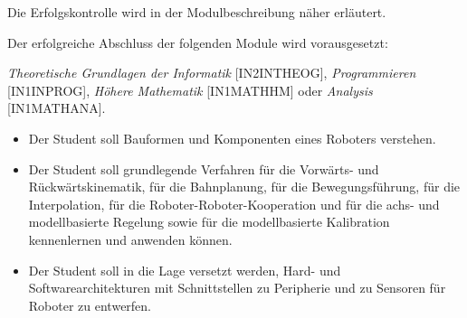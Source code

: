 \begin{course}

\setdoclanguagegerman
{}



\coursehead


\label{cour_5593.dp_997}


\begin{styleenv}
\begin{assessment}
Die Erfolgskontrolle wird in der Modulbeschreibung näher erläutert.


\end{assessment}

\begin{conditions}Der erfolgreiche Abschluss der folgenden Module wird vorausgesetzt:

 

\emph{Theoretische Grundlagen der Informatik }[IN2INTHEOG], \emph{Programmieren }[IN1INPROG], \emph{Höhere Mathematik} [IN1MATHHM] oder \emph{Analysis} [IN1MATHANA].

\end{conditions}


\end{styleenv}

\begin{learningoutcomes}
\begin{itemize}\item Der Student soll Bauformen und Komponenten eines Roboters verstehen.  \item Der Student soll grundlegende Verfahren für die Vorwärts- und Rückwärtskinematik, für die Bahnplanung, für die Bewegungsführung, für die Interpolation, für die Roboter-Roboter-Kooperation und für die achs- und modellbasierte Regelung sowie für die modellbasierte Kalibration kennenlernen und anwenden können.   \item Der Student soll in die Lage versetzt werden, Hard- und Softwarearchitekturen mit Schnittstellen zu Peripherie und zu Sensoren für Roboter zu entwerfen.  \end{itemize}
\end{learningoutcomes}


\end{course}
